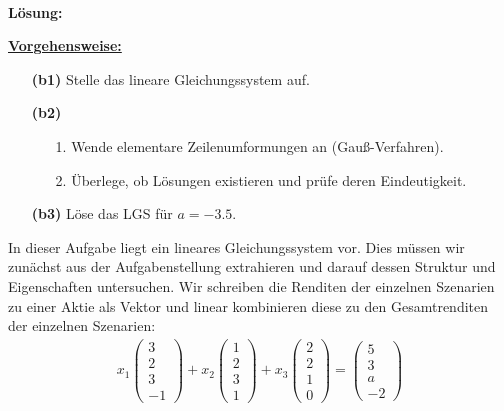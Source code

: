 \ \\
\textbf{Lösung:}
\begin{mdframed}
\underline{\textbf{Vorgehensweise:}}
\renewcommand{\labelenumi}{\theenumi.}
\begin{enumerate}
\item[\textbf{(b1)}] Stelle das lineare Gleichungssystem auf.
\item[\textbf{(b2)}] 
\begin{enumerate}
	\item[1.] Wende elementare Zeilenumformungen an (Gauß-Verfahren).
	\item[2.] Überlege, ob Lösungen existieren und prüfe deren Eindeutigkeit.
\end{enumerate}

\item[\textbf{(b3)}] Löse das LGS für $a=-3.5 $.
\end{enumerate}
\end{mdframed}

In dieser Aufgabe liegt ein lineares Gleichungssystem vor.
Dies müssen wir zunächst aus der Aufgabenstellung extrahieren und darauf dessen Struktur und Eigenschaften untersuchen.
Wir schreiben die Renditen der einzelnen Szenarien zu einer Aktie als Vektor und linear kombinieren diese zu den Gesamtrenditen der einzelnen Szenarien:
\begin{align*}
	x_1
	\begin{pmatrix}
		3 \\ 2 \\ 3 \\ -1
	\end{pmatrix}
	+
	x_2
	\begin{pmatrix}
		1 \\ 2 \\ 3 \\ 1
	\end{pmatrix}
	+
	x_3
	\begin{pmatrix}
		2 \\ 2 \\ 1 \\ 0
	\end{pmatrix}
	=
	\begin{pmatrix}
		5 \\ 3 \\ a \\ -2
	\end{pmatrix}
\end{align*}

